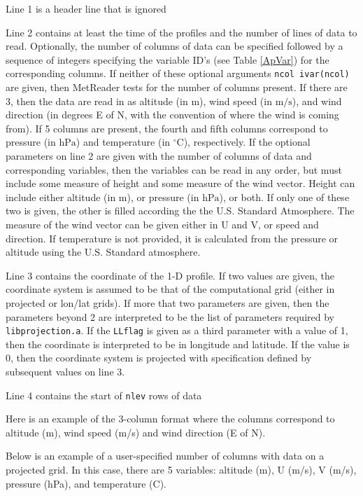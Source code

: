 \documentclass[11pt]{article}   %
\begin{document}
Line 1 is a header line that is ignored

Line 2 contains at least the time of the profiles and the number of lines of data
to read.  Optionally, the number of columns of data can be specified followed by 
a sequence of integers specifying the variable ID's (see Table \ref{ApVar}) for the corresponding
columns.  If neither of these optional arguments \texttt{ncol ivar(ncol)} are given,
then MetReader tests for the number of columns present.  If there are 3, then
the data are read in as altitude (in $\mathrm{m}$), wind speed (in $\mathrm{m/s}$), and 
wind direction (in degrees E of N, with the convention of where the wind is coming from).
If 5 columns are present, the fourth and fifth columns correspond to pressure (in $\mathrm{hPa}$)
and temperature (in $\mathrm{^{\circ}C}$), respectively.  If the optional parameters on line 2
are given with the number of columns of data and corresponding variables, then the variables
can be read in any order, but must include some measure of height and some measure of the 
wind vector.  Height can include either altitude (in $\mathrm{m}$), or pressure (in $\mathrm{hPa}$),
or both.  If only one of these two is given, the other is filled according the the U.S. Standard
Atmosphere.  The measure of the wind vector can be given either in U and V, or speed and direction.
If temperature is not provided, it is calculated from the pressure or altitude using the
U.S. Standard atmosphere.

Line 3 contains the coordinate of the 1-D profile.  If two values are given, the coordinate
system is assumed to be that of the computational grid (either in projected or lon/lat grids).
If more that two parameters are given, then the parameters beyond 2 are interpreted to be the list
of parameters required by \texttt{libprojection.a}.
If the \texttt{LLflag} is given as a third parameter with a value of 1, then the coordinate
is interpreted to be in longitude and latitude.  If the value is 0, then the coordinate system
is projected with specification defined by subsequent values on line 3.

Line 4 contains the start of \texttt{nlev} rows of data

Here is an example of the 3-column format where the columns correspond to altitude (m),
wind speed (m/s) and wind direction (E of N).
\small  \normalsize

Below is an example of a user-specified number of columns with data on a 
projected grid. In this case, there are 5 variables: altitude (m), U (m/s),
V (m/s), pressure (hPa), and temperature (C).
\small  \normalsize
\end{document}
